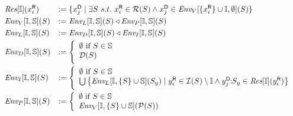\documentclass{article}
\begin{document}
\pagestyle{empty}
\noindent
\renewcommand{\S}{\mathcal{S}}
\begin{minipage}{12.3cm}%
$$
\begin{array}{ll}
  \Res{\seeni}{\ri{x}{i}} & := \{ \di{x}{j} \mid \exists S\ s.t.\ \ri{x}{i} \in \R{S} \wedge \di{x}{j} \in \Env{V}{\{\ri{x}{i}\} \cup \seeni}{\emptyset}{S} \} \smallskip  \\
  \Env{V}{\seeni}{\seens}{S}  & := \Env{L}{\seeni}{\seens}{S} \triangleleft \Env{P}{\seeni}{\seens}{S} \smallskip\\
 \Env{L}{\seeni}{\seens}{S} & := \Env{D}{\seeni}{\seens}{S} \triangleleft \Env{I}{\seeni}{\seens}{S} \smallskip\\
 \Env{D}{\seeni}{\seens}{S} &:= \left\{
    \begin{array}{l}
      \emptyset  \text{ if } S\in\seens\\
      \D{S}\smallskip\\
    \end{array}
 \right.\smallskip\\
 \Env{I}{\seeni}{\seens}{S} &:= \left\{
    \begin{array}{l}
      \emptyset  \text{ if } S\in\seens\\
      \bigcup \left\{ \Env{L}{\seeni}{\{S\}\cup\seens}{S_y} \mid \ri{y}{i} \in \I{S} \setminus 
\seeni \wedge \dsi{y}{j}{S_y} \in \Res{\seeni}{\ri{y}{i}}\right\}\smallskip\\
    \end{array}
 \right.\smallskip\\
 \Env{P}{\seeni}{\seens}{S} & := \left\{
    \begin{array}{l}
      \emptyset  \text{ if } S\in\seens\\
      \Env{V}{\seeni}{\{S\}\cup\seens}{\P{S}}
    \end{array}
 \right.\smallskip\\
\end{array}\medskip
$$


\end{minipage}%
\end{document}
